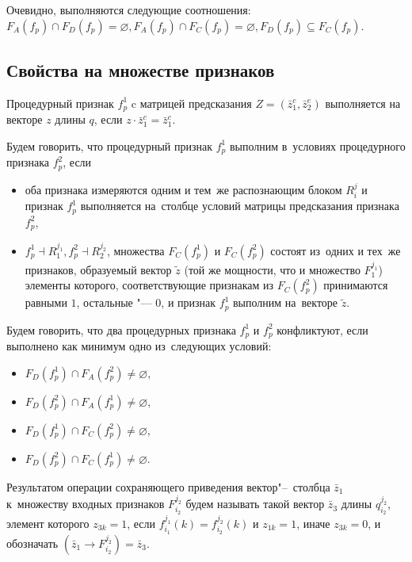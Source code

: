 Очевидно, выполняются следующие соотношения: $F_A(f_p)\cap F_D(f_p)=\varnothing, F_A(f_p)\cap F_C(f_p)=\varnothing, F_D(f_p)\subseteq F_C(f_p)$.

\subsection{Свойства на множестве признаков}

\begin{Def}
	Процедурный признак $f_p^1$ c матрицей предсказания $Z=(\bar z_1^c,\bar z_2^e)$ выполняется на векторе $z$ длины $q$, если $z\cdot \bar z_1^c=\bar z_1^c$.
\end{Def}
Будем говорить, что процедурный признак $f_p^1$ выполним в~условиях процедурного признака $f_p^2$, если 
\begin{itemize}
	\item оба признака измеряются одним и тем~же распознающим блоком $R_i^j$ и признак  $f_p^1$ выполняется на~столбце условий матрицы предсказания признака $f_p^2$,
	\item $f_p^1\dashv R_1^{j_1}, f_p^2\dashv R_2^{j_2}$, множества $F_C(f_p^1 )$ и $F_C(f_p^2)$ состоят из~одних и тех~же признаков, образуемый вектор $\tilde z$ (той же мощности, что и множество $F_1^{j_1}$) элементы которого, соответствующие признакам из $F_C(f_p^2)$ принимаются равными $1$,  остальные "--- $0$, и признак $f_p^1$ выполним на~векторе $\tilde z$. 
\end{itemize}

\begin{Def}
	Будем говорить, что два процедурных признака $f_p^1$ и $f_p^2$ конфликтуют, если выполнено как минимум одно из~следующих условий:
	\begin{itemize}
		\item $F_D(f_p^1)\cap F_A(f_p^2)\not=\varnothing$,
		\item $F_D(f_p^2)\cap F_A(f_p^1)\not=\varnothing$,
		\item $F_D(f_p^1)\cap F_C(f_p^2)\not=\varnothing$,
		\item $F_D(f_p^2)\cap F_C(f_p^1)\not=\varnothing$.
	\end{itemize}
\end{Def}

\begin{Def}
	Результатом операции сохраняющего приведения вектор"--~столбца $\bar z_1$ к~множеству входных признаков $F_{i_2}^{j_2}$ будем называть такой вектор $\bar z_3$ длины $q_{i_2}^{j_2}$, элемент которого $z_{3k}=1$, если $f_{i_1}^{j_1}(k)=f_{i_2}^{j_2}(k)$ и $z_{1k}=1$, иначе $z_{3k}=0$, и обозначать $(\bar z_1\rightarrow F_{i_2}^{j_2})=\bar z_3$.
\end{Def}

